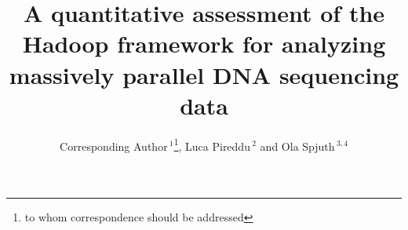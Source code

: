 \documentclass{bioinfo}
\begin{document}

\title[Hadoop for analyzing DNA sequence data]{A quantitative assessment of the Hadoop framework for analyzing massively parallel DNA sequencing data}
\author[Alexey Siretskiy]{Corresponding Author\,$^1$\footnote{to whom correspondence should be addressed}, Luca Pireddu\,$^{2}$ and Ola Spjuth\,$^{3,4}$}
\address{$^{1}$Department of Information Technology, Uppsala University, Uppsala, Sweden\\
$^{2}$CRS4, Polaris, Pula, Italy\\
$^{3}$Department of Pharmaceutical Biosciences, Uppsala University, Uppsala, Sweden\\
$^{4}$Science for Life Laboratory, Uppsala University, Uppsala, Sweden}





\maketitle
\end{document}
